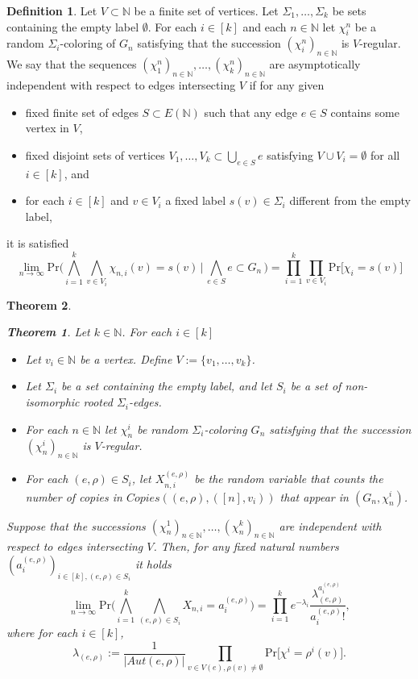 \documentclass[12pt,notitlepage,a4paper]{article}
\newtheorem{theorem}{Theorem}[section]
\theoremstyle{definition}
\newtheorem{definition}{Definition}[section]
\newcommand{\N}{\mathbb{N}}
\newcommand{\Ln}{\lim\limits_{n\to \infty}}
\begin{document}
\begin{definition} 
	Let $V\subset \N$ be a finite set of vertices. 
	Let $\Sigma_1,\dots, \Sigma_k$ be sets containing the empty label 
	$\emptyset$. For each $i\in [k]$ and each $n\in \N$
	let $\chi_i^n$ be a random $\Sigma_i$-coloring
	of $G_n$ satisfying that the succession $(\chi_i^n)_{n\in \N}$ is
	$V$-regular. We say that the sequences $(\chi_1^n)_{n\in \N},
	\dots, (\chi_k^n)_{n\in \N}$ are asymptotically independent
	with respect to edges intersecting $V$ if for any given
	\begin{itemize}
		\item fixed finite set of edges $S\subset E(\N)$ such that any edge $e\in S$ 
		contains some vertex in $V$,
		\item fixed disjoint sets of vertices $V_1,\dots, V_k \subset \bigcup_{e\in S}e$ 
		satisfying $V\cup V_i=\emptyset$ for all $i\in [k]$, and
		\item for each $i\in [k]$ and $v\in V_i$ a fixed label $s(v)\in \Sigma_i$
		different from the empty label,
	\end{itemize}
	it is satisfied 
	\[
	\Ln \mathrm{Pr}\big(
	\bigwedge_{i=1}^k \bigwedge_{v\in V_i} \chi_{n,i}(v)=s(v)
	\, \big| \, \bigwedge_{e\in S} e\subset G_n \,
	\big) = \prod_{i=1}^k \prod_{v\in V_i} \mathrm{Pr}\big[\chi_i=s(v)
	\big]		
	\]
\end{definition}


\begin{theorem}
	\begin{theorem}
		Let $k\in \N$.	For each $i\in [k]$ 
		\begin{itemize}
			\item Let $v_i\in \N$ be a vertex. Define $V:=\{v_1,\dots,v_k\}$.
			\item Let $\Sigma_i$ be a set containing the empty label, and let $S_i$ be a set
			of non-isomorphic rooted $\Sigma_i$-edges. 
			\item For each $n\in \N$ let $\chi^i_n$ be random $\Sigma_i$-coloring
			$G_n$ satisfying that the succession $(\chi^i_n)_{n\in \N}$ is $V$-regular. 
			\item For each $(e,\rho)\in S_i$, let $X^{(e,\rho)}_{n,i}$ be the random 
			variable that counts the number of copies in $Copies((e,\rho),([n],v_i))$
			that appear in $(G_n,\chi^i_n)$.				
		\end{itemize}
		Suppose that the
		successions $(\chi^1_n)_{n\in\N}, \dots, (\chi^k_n)_{n\in\N}$
		are independent with respect to edges intersecting $V$.
		Then, for any fixed natural numbers 
		$(a^{(e,\rho)}_{i})_{i\in [k], (e,\rho)\in S_i}$ it holds
		\[
		\Ln \mathrm{Pr}\big( \bigwedge_{i=1}^k \bigwedge_{(e,\rho)\in S_i}
		 X_{n,i}=a^{(e,\rho)}_i  \big)=
		\prod_{i=1}^{k}e^{-\lambda_i}\frac{\lambda_{(e,\rho)}^{a^{(e,\rho)}_i}}{{a^{(e,\rho)}_i}!},
		\]
		where for each $i\in [k]$,
		\[
		\lambda_{(e,\rho)}:= \frac{1}{|Aut(e,\rho)|} 
		\prod_{v\in V(e), \rho(v)\neq \emptyset}
		\mathrm{Pr}\big[\chi^i=\rho^i(v)\big].
		\]
	\end{theorem}
\end{theorem}
	
\end{document}
